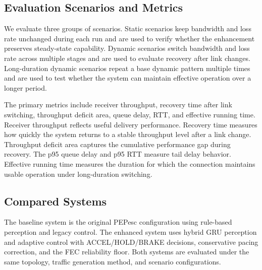 \subsection{Evaluation Scenarios and Metrics}
We evaluate three groups of scenarios. Static scenarios keep bandwidth and loss rate unchanged during each run and are used to verify whether the enhancement preserves steady-state capability. Dynamic scenarios switch bandwidth and loss rate across multiple stages and are used to evaluate recovery after link changes. Long-duration dynamic scenarios repeat a base dynamic pattern multiple times and are used to test whether the system can maintain effective operation over a longer period.

The primary metrics include receiver throughput, recovery time after link switching, throughput deficit area, queue delay, RTT, and effective running time. Receiver throughput reflects useful delivery performance. Recovery time measures how quickly the system returns to a stable throughput level after a link change. Throughput deficit area captures the cumulative performance gap during recovery. The p95 queue delay and p95 RTT measure tail delay behavior. Effective running time measures the duration for which the connection maintains usable operation under long-duration switching.

\subsection{Compared Systems}
The baseline system is the original PEPesc configuration using rule-based perception and legacy control. The enhanced system uses hybrid GRU perception and adaptive control with ACCEL/HOLD/BRAKE decisions, conservative pacing correction, and the FEC reliability floor. Both systems are evaluated under the same topology, traffic generation method, and scenario configurations.
